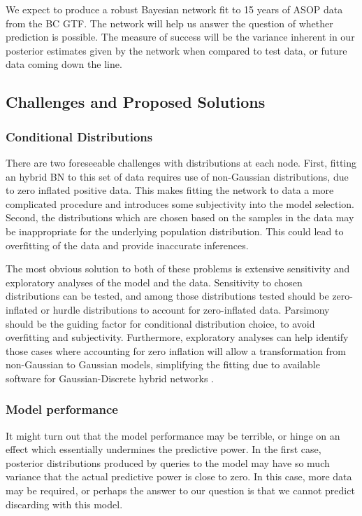 \documentclass{article}
\begin{document}
We expect to produce a robust Bayesian network fit to 15 years of ASOP data from the BC GTF. The network will help us answer the question of whether prediction is possible. The measure of success will be the variance inherent in our posterior estimates given by the network when compared to test data, or future data coming down the line.

\subsection{Challenges and Proposed Solutions}

\subsubsection*{Conditional Distributions}

There are two foreseeable challenges with distributions at each node. First, fitting an hybrid BN to this set of data requires use of non-Gaussian distributions, due to zero inflated positive data. This makes fitting the network to data a more complicated procedure and introduces some subjectivity into the model selection. Second, the distributions which are chosen based on the samples in the data may be inappropriate for the underlying population distribution. This could lead to overfitting of the data and provide inaccurate inferences.

The most obvious solution to both of these problems is extensive sensitivity and exploratory analyses of the model and the data. Sensitivity to chosen distributions can be tested, and among those distributions tested should be zero-inflated or hurdle distributions to account for zero-inflated data. Parsimony should be the guiding factor for conditional distribution choice, to avoid overfitting and subjectivity. Furthermore, exploratory analyses can help identify those cases where accounting for zero inflation will allow a transformation from non-Gaussian to Gaussian models, simplifying the fitting due to available software for Gaussian-Discrete hybrid networks \citep{nagarajan2013bayesian}.

\subsubsection*{Model performance}

It might turn out that the model performance may be terrible, or hinge on an effect which essentially undermines the predictive power. In the first case, posterior distributions produced by queries to the model may have so much variance that the actual predictive power is close to zero. In this case, more data may be required, or perhaps the answer to our question is that we cannot predict discarding with this model.
\end{document}
